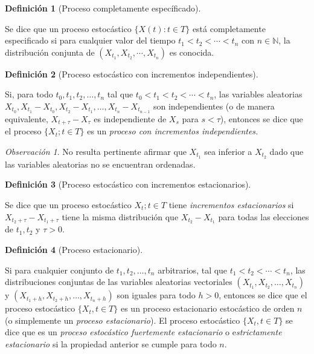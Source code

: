 \documentclass[
  us-letterpaper,
]{scrreprt}
\theoremstyle{definition}
\theoremstyle{plain}
\theoremstyle{plain}
\theoremstyle{definition}
\newtheorem{definition}{Definición}[chapter]
\theoremstyle{remark}
\newtheorem*{remark}{Observación}
\begin{document}
\begin{definition}[Proceso completamente
específicado]\protect\hypertarget{def-pcesp}{}\label{def-pcesp}

Se dice que un proceso estocástico \(\{X(t):t\in T\}\) está
completamente especificado si para cualquier valor del tiempo
\(t_1<t_2<\cdots<t_n\) con \(n\in\mathbb N\), la distribución conjunta
de \((X_{t_1}, X_{t_2},\cdots,X_{t_n})\) es conocida.

\end{definition}

\begin{definition}[Proceso estocástico con incrementos
independientes]\protect\hypertarget{def-incind}{}\label{def-incind}

Si, para todo \(t_0,t_1,t_2,\ldots,t_n\) tal que
\(t_0<t_1<t_2<\cdots<t_n\), las variables aleatorias
\(X_{t_0}, X_{t_1}-X_{t_0}, X_{t_2}-X_{t_1},\ldots,X_{t_n}-X_{t_{n-1}}\)
son independientes (o de manera equivalente, \(X_{t+\tau}-X_\tau\) es
independiente de \(X_s\) para \(s< \tau\)), entonces se dice que el
proceso \(\{X_t; t\in T\}\) es un \emph{proceso con incrementos
independientes.}

\end{definition}

\begin{remark}
No resulta pertinente afirmar que \(X_{t_1}\) sea inferior a \(X_{t_2}\)
dado que las variables aleatorias no se encuentran ordenadas.
\end{remark}

\begin{definition}[Proceso estocástico con incrementos
estacionarios]\protect\hypertarget{def-incest}{}\label{def-incest}

Se dice que un proceso estocástico \({X_t; t\in T}\) tiene
\emph{incrementos estacionarios} si \(X_{t_2+\tau}-X_{t_1+\tau}\) tiene
la misma distribución que \(X_{t_2}-X_{t_1}\) para todas las elecciones
de \(t_1,t_2\) y \(\tau>0\).

\end{definition}

\begin{definition}[Proceso
estacionario]\protect\hypertarget{def-procesoest}{}\label{def-procesoest}

Si para cualquier conjunto de \(t_1, t_2, \ldots , t_n\) arbitrarios,
tal que \(t_1< t_2 < \cdots < t_n\), las distribuciones conjuntas de las
variables aleatorias vectoriales \((X_{t_1}, X_{t_2},\ldots, X_{t_n})\)
y \((X_{t_1+h}, X_{t_2+h},\ldots , X_{t_n+h})\) son iguales para todo
\(h > 0\), entonces se dice que el proceso estocástico
\(\{X_t, t \in T\}\) es un proceso estacionario estocástico de orden
\(n\) (o simplemente un \emph{proceso estacionario}). El proceso
estocástico \(\{X_t, t \in T\}\) se dice que es un \emph{proceso
estocástico fuertemente estacionario} o e\emph{strictamente
estacionario} si la propiedad anterior se cumple para todo \(n\).

\end{definition}
\end{document}
